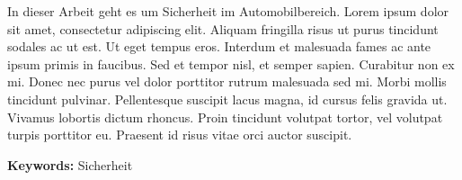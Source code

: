 In dieser Arbeit geht es um Sicherheit im Automobilbereich. 
Lorem ipsum dolor sit amet, consectetur adipiscing elit. Aliquam fringilla risus ut purus tincidunt sodales ac ut est. Ut eget tempus eros. Interdum et malesuada fames ac ante ipsum primis in faucibus. Sed et tempor nisl, et semper sapien. Curabitur non ex mi. Donec nec purus vel dolor porttitor rutrum malesuada sed mi. Morbi mollis tincidunt pulvinar. Pellentesque suscipit lacus magna, id cursus felis gravida ut. Vivamus lobortis dictum rhoncus. Proin tincidunt volutpat tortor, vel volutpat turpis porttitor eu. Praesent id risus vitae orci auctor suscipit.

\textbf{Keywords:} Sicherheit
